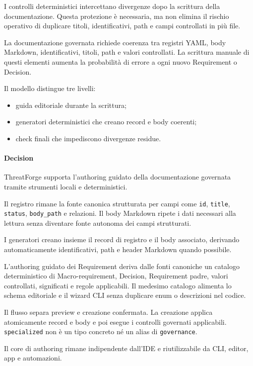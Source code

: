 \documentclass[
  10pt,
]{article}
\providecommand{\tightlist}{%
  \setlength{\itemsep}{0pt}\setlength{\parskip}{0pt}}
\begin{document}
I controlli deterministici intercettano divergenze dopo la scrittura
della documentazione. Questa protezione è necessaria, ma non elimina il
rischio operativo di duplicare titoli, identificativi, path e campi
controllati in più file.

La documentazione governata richiede coerenza tra registri YAML, body
Markdown, identificativi, titoli, path e valori controllati. La
scrittura manuale di questi elementi aumenta la probabilità di errore a
ogni nuovo Requirement o Decision.

Il modello distingue tre livelli:

\begin{itemize}
\tightlist
\item
  guida editoriale durante la scrittura;
\item
  generatori deterministici che creano record e body coerenti;
\item
  check finali che impediscono divergenze residue.
\end{itemize}

\paragraph{Decision}\label{decision-24}

ThreatForge supporta l'authoring guidato della documentazione governata
tramite strumenti locali e deterministici.

Il registro rimane la fonte canonica strutturata per campi come
\texttt{id}, \texttt{title}, \texttt{status}, \texttt{body\_path} e
relazioni. Il body Markdown ripete i dati necessari alla lettura senza
diventare fonte autonoma dei campi strutturati.

I generatori creano insieme il record di registro e il body associato,
derivando automaticamente identificativi, path e header Markdown quando
possibile.

L'authoring guidato dei Requirement deriva dalle fonti canoniche un
catalogo deterministico di Macro-requirement, Decision, Requirement
padre, valori controllati, significati e regole applicabili. Il medesimo
catalogo alimenta lo schema editoriale e il wizard CLI senza duplicare
enum o descrizioni nel codice.

Il flusso separa preview e creazione confermata. La creazione applica
atomicamente record e body e poi esegue i controlli governati
applicabili. \texttt{specialized} non è un tipo concreto né un alias di
\texttt{governance}.

Il core di authoring rimane indipendente dall'IDE e riutilizzabile da
CLI, editor, app e automazioni.
\end{document}
